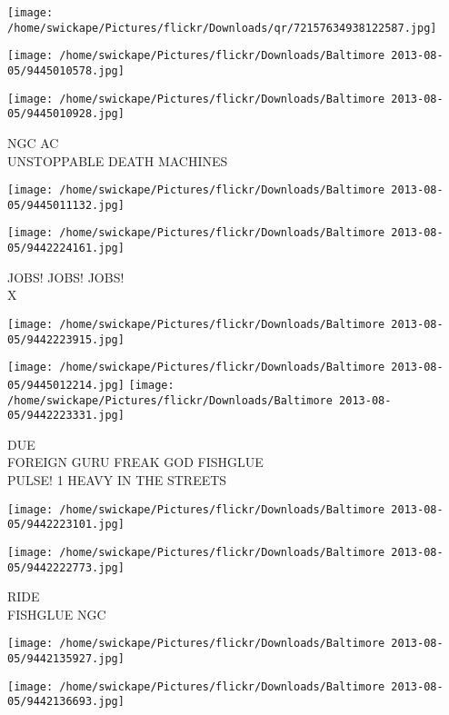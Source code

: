 \documentclass[10pt,letterpaper]{article}
\begin{document}
\texttt{[image: /home/swickape/Pictures/flickr/Downloads/qr/72157634938122587.jpg]}
\pagebreak

\texttt{[image: /home/swickape/Pictures/flickr/Downloads/Baltimore 2013-08-05/9445010578.jpg]}

\vspace{0.25in}
\texttt{[image: /home/swickape/Pictures/flickr/Downloads/Baltimore 2013-08-05/9445010928.jpg]}

NGC AC\\
UNSTOPPABLE DEATH MACHINES
\pagebreak

\texttt{[image: /home/swickape/Pictures/flickr/Downloads/Baltimore 2013-08-05/9445011132.jpg]}

\vspace{0.25in}
\texttt{[image: /home/swickape/Pictures/flickr/Downloads/Baltimore 2013-08-05/9442224161.jpg]}

JOBS! JOBS! JOBS!\\
X
\pagebreak

\texttt{[image: /home/swickape/Pictures/flickr/Downloads/Baltimore 2013-08-05/9442223915.jpg]}

\vspace{0.25in}
\texttt{[image: /home/swickape/Pictures/flickr/Downloads/Baltimore 2013-08-05/9445012214.jpg]}
\texttt{[image: /home/swickape/Pictures/flickr/Downloads/Baltimore 2013-08-05/9442223331.jpg]}

DUE\\
FOREIGN GURU FREAK GOD FISHGLUE\\
PULSE! 1 HEAVY IN THE STREETS
\pagebreak

\texttt{[image: /home/swickape/Pictures/flickr/Downloads/Baltimore 2013-08-05/9442223101.jpg]}

\vspace{0.25in}
\texttt{[image: /home/swickape/Pictures/flickr/Downloads/Baltimore 2013-08-05/9442222773.jpg]}

RIDE\\
FISHGLUE NGC
\pagebreak

\texttt{[image: /home/swickape/Pictures/flickr/Downloads/Baltimore 2013-08-05/9442135927.jpg]}

\vspace{0.25in}
\texttt{[image: /home/swickape/Pictures/flickr/Downloads/Baltimore 2013-08-05/9442136693.jpg]}
\end{document}
